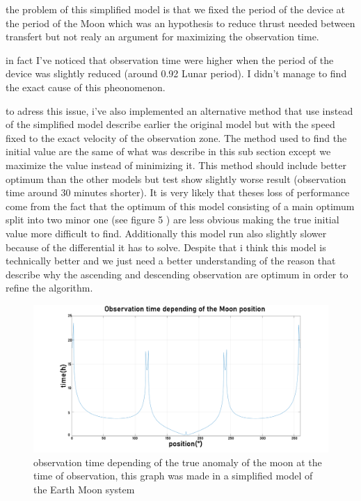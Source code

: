 \documentclass[11pt]{article} %
\begin{document}
		the problem of this simplified model is that we fixed the period of the device at the period of the Moon which was an hypothesis to reduce thrust needed between transfert but not realy an argument for maximizing the observation time.
		
		in fact I've noticed that observation time were higher when the period of the device was slightly reduced (around 0.92 Lunar period). I didn't manage to find the exact cause of this pheonomenon.
		
		
		to adress this issue, i've also implemented an alternative method that use instead of the simplified model describe earlier the original model but with the speed fixed to the exact velocity of the observation zone. The method used to find the initial value are the same of what was describe in this sub section except we maximize the value instead of minimizing it. This method should include better optimum than the other models but test show slightly worse result (observation time around 30 minutes shorter). It is very likely that theses loss of performance come from the fact that the optimum of this model consisting of a main optimum split into two minor one (see figure 5 ) are less obvious making the true initial value more difficult to find. Additionally this model run also slightly slower because of the differential it has to solve. Despite that i think this model is technically better and we just need a better understanding of the reason that describe why the ascending and descending observation are optimum in order to refine the algorithm.
		
		\begin{figure}[h]
			\includegraphics[width=1\textwidth]{images/observation_Obs.png}
			\caption{observation time depending of the true anomaly of the moon at the time of observation, this graph was made in a simplified model of the Earth Moon system}
		\end{figure}
		
\end{document}
